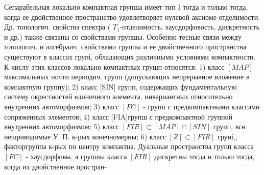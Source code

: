 \documentclass[10pt]{article}
\begin{document}
Сепарабельная локально компактная групша имеет тип I тогда и только тогда, когда ее двойственное пространство удовлетворяет нулевой аксиоме отделимости. Др. топологич. свойства спектра ( $T_{1}$-отделимость, хаусдорфовость, дискретность и др.) также связаны со свойствами групшы. Особенно тесные связи между топологич. и алгебраич. свойствами группы и ее двойственного пространства существуют в классах групі, обладающих различными условиями компактности. К числу этих классов локально компактных грушп относятся: 1) класс $[M A P]$ максимальных почти периодич. групп (допускающих непрерывное вложение в компактную группу); 2) класс [SIN] групп, содержащих фундаментальную систему окрестностей единичного әлемента, инвариантных относительно внутренних автоморфизмов; 3) класс $[F C]$ - групп с предкомпактными классами сопряженных элементов; 4) класс [FIA]групш с предкомпактной группой внутренних автоморфизмов; 5) класс $[F I R] \subset[M A P] \cap[S I N]$ групп, всө нешриводимые У. П. к-рых конечномерны; 6) класс $[Z] \subset[F I R]$ груні,, факторгруппа к-рых по центру компактна. Дуальные пространства групп класса $[F C]$ - хаусдорфовы, а групшы класса $[F I R]$ дискретны тогда и только тогда, когда их двоӥственное простран-
\end{document}
